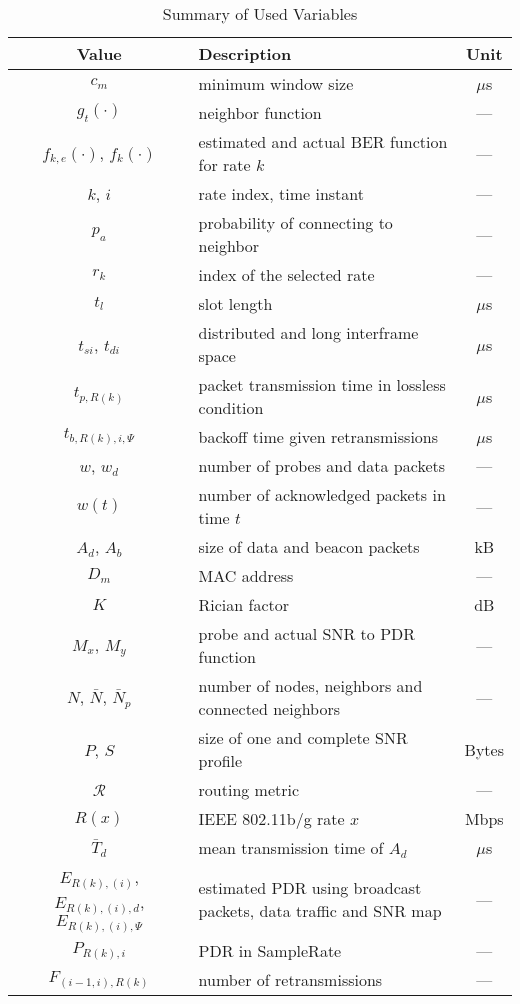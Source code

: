\documentclass[11pt,draftclsnofoot,journal,onecolumn]{IEEEtran}
\begin{document}
\begin{table*}
\centering
\caption{Summary of Used Variables}
\label{variables}
\begin{tabular}{c|l|c}
  \hline
  Value & Description & Unit\\
  \hline\hline
  $c_m$ & minimum window size & $\mu$s \\
  $g_t(\cdot)$ & neighbor function & --- \\
  $f_{k,e}(\cdot)$, $f_k(\cdot)$ & estimated and actual BER function for rate $k$ & --- \\
  $k$, $i$ & rate index, time instant & --- \\
  $p_a$ & probability of connecting to neighbor & --- \\
  $r_k$ & index of the selected rate & --- \\
  $t_l$ & slot length & $\mu$s\\
  $t_{si}$, $t_{di}$ & distributed and long interframe space & $\mu$s \\
  $t_{p,R(k)}$ & packet transmission time in lossless condition & $\mu$s \\
  $t_{b,R(k),i,\Psi}$ & backoff time given retransmissions & $\mu$s \\
  $w$, $w_d$ & number of probes and data packets & --- \\
  $w(t)$ & number of acknowledged packets in time $t$ & --- \\
  $A_d$, $A_b$ & size of data and beacon packets & kB \\
  $D_m$ & MAC address & --- \\
  $K$ & Rician factor & dB \\
  $M_x$, $M_y$ & probe and actual SNR to PDR function & --- \\
  $N$, $\bar N$, $\bar N_p$ & number of nodes, neighbors and connected neighbors & --- \\
  $P$, $S$ & size of one and complete SNR profile & Bytes \\
  $\mathcal{R}$ & routing metric & --- \\
  $R(x)$ & IEEE 802.11b/g rate $x$ & Mbps\\
  $\bar T_d$ & mean transmission time of $A_d$ & $\mu$s \\
  $E_{R(k),(i)}$, $E_{R(k),(i),d}$, $E_{R(k),(i),\Psi}$ & estimated PDR using broadcast packets, data traffic and SNR map& --- \\
  $P_{R(k),i}$ & PDR in SampleRate & --- \\
  $F_{(i-1,i),R(k)}$ & number of retransmissions & --- \\

\end{tabular}
\end{table*}
\end{document}
